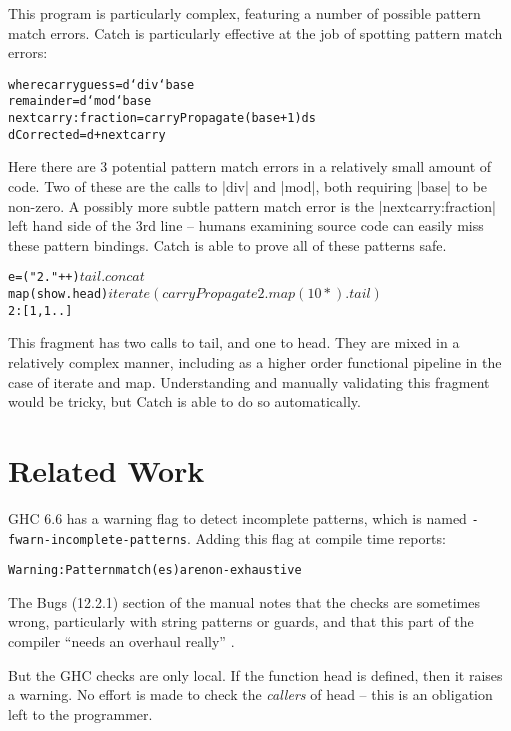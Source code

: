 \documentclass[preprint]{sigplanconf}
\newcommand{\T}[1]{\texttt{#1}}
\newcommand{\C}[1]{\textsf{#1}}
\newenvironment{code}{\begin{alltt}\small}{\end{alltt}}
\begin{document}
This program is particularly complex, featuring a number of possible pattern match errors. Catch is particularly effective at the job of spotting pattern match errors:

\begin{code}
  where  carryguess = d `div` base
         remainder = d `mod` base
         nextcarry:fraction = carryPropagate (base+1) ds
         dCorrected = d + nextcarry
\end{code}

Here there are 3 potential pattern match errors in a relatively small amount of code. Two of these are the calls to |div| and |mod|, both requiring |base| to be non-zero. A possibly more subtle pattern match error is the |nextcarry:fraction| left hand side of the 3rd line -- humans examining source code can easily miss these pattern bindings. Catch is able to prove all of these patterns safe.

\begin{code}
e =  ("2."++) $
     tail . concat $
     map (show.head) $
     iterate (carryPropagate 2 . map (10*) . tail) $
     2:[1,1..]
\end{code}

This fragment has two calls to \C{tail}, and one to \C{head}. They are mixed in a relatively complex manner, including as a higher order functional pipeline in the case of \C{iterate} and \C{map}. Understanding and manually validating this fragment would be tricky, but Catch is able to do so automatically.

\section{Related Work}
\label{sec:related}


GHC \citep{ghc_manual} 6.6 has a warning flag to detect incomplete patterns, which is named \T{-fwarn-incomplete-patterns}. Adding this flag at compile time reports:

\begin{code}
Warning: Pattern match(es) are non-exhaustive
\end{code}

The Bugs (12.2.1) section of the manual notes that the checks are sometimes wrong, particularly with string patterns or guards, and that this part of the compiler ``needs an overhaul really'' \citep{ghc_manual}.

But the GHC checks are only local. If the function \C{head} is defined, then it raises a warning. No effort is made to check the \textit{callers} of \C{head} -- this is an obligation left to the programmer.
\end{document}
